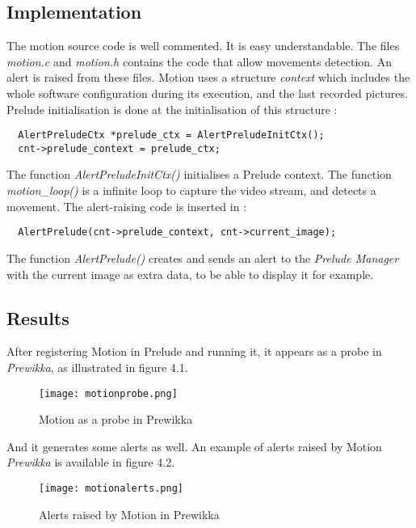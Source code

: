 \documentclass{koala-en}
\begin{document}
\subsection{Implementation}
The motion source code is well commented. It is easy understandable.
\newline
\newline
The files \emph{motion.c} and \emph{motion.h} contains the code that allow movements detection. An alert is raised from these files.
\newline
\newline
Motion uses a structure \emph{context} which includes the whole software configuration during its execution, and the last recorded pictures.
Prelude initialisation is done at the initialisation of this structure :
\begin{lstlisting}
  AlertPreludeCtx *prelude_ctx = AlertPreludeInitCtx();
  cnt->prelude_context = prelude_ctx;
\end{lstlisting}
The function \emph{AlertPreludeInitCtx()} initialises a Prelude context.
\newline
\newline
The function \emph{motion\_loop()} is a infinite loop to capture the video stream, and detects a movement. The alert-raising code is inserted in :
\begin{lstlisting}
  AlertPrelude(cnt->prelude_context, cnt->current_image);
\end{lstlisting}
The function \emph{AlertPrelude()} creates and sends an alert to the \emph{Prelude Manager} with the current image as extra data, to be able to display it for example.

\subsection{Results}
After registering Motion in Prelude and running it, it appears as a probe in \emph{Prewikka}, as illustrated in figure 4.1.
\begin{figure}[!ht]
  \center
  \texttt{[image: motionprobe.png]}
  \caption{Motion as a probe in Prewikka}
\end{figure}

And it generates some alerts as well. An example of alerts raised by Motion \emph{Prewikka} is available in figure 4.2.
\begin{figure}[!ht]
  \center
  \texttt{[image: motionalerts.png]}
  \caption{Alerts raised by Motion in Prewikka}
\end{figure}
\end{document}
